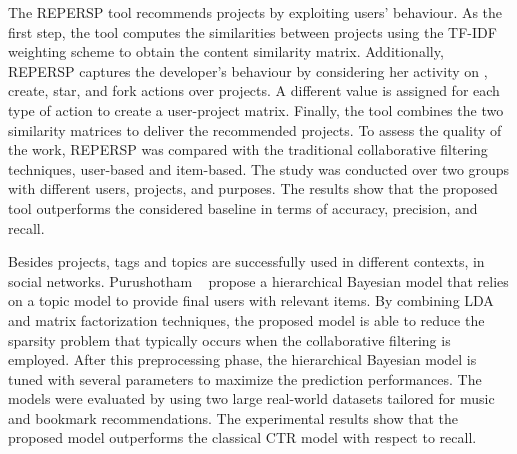 The REPERSP tool \cite{xu_repersp_2017} recommends \GH projects by exploiting 
users' behaviour. As the first step, the tool computes the similarities between 
projects using the TF-IDF weighting scheme to obtain the content similarity 
matrix. Additionally, REPERSP captures the developer's behaviour by considering 
her activity on \GH, \ie create, star, and fork actions over projects. A 
different value is assigned for each type of action to create a user-project 
matrix. Finally, the tool combines the two similarity matrices to deliver the 
recommended projects. To assess the quality of the work, REPERSP was compared 
with the traditional collaborative filtering techniques, \ie user-based and 
item-based. The study was conducted over two groups with different users, 
projects, and purposes. The results show that the proposed tool outperforms the 
considered baseline in terms of accuracy, precision, and recall. 

Besides \GH projects, tags and topics are successfully used in different 
contexts, \ie in social networks. Purushotham \etal~\cite{purushotham_collaborative_nodate} propose a hierarchical Bayesian model 
that relies on a topic model to provide final users with relevant items. By 
combining  LDA and matrix factorization techniques, the proposed model is able 
to reduce the sparsity problem that typically occurs when the collaborative 
filtering is employed. After this preprocessing phase, the hierarchical 
Bayesian model is tuned with several parameters to maximize the prediction 
performances. The models were evaluated by using two large real-world datasets 
tailored for music and bookmark recommendations. The experimental results show that the 
proposed model outperforms the classical CTR model with respect to recall. 

